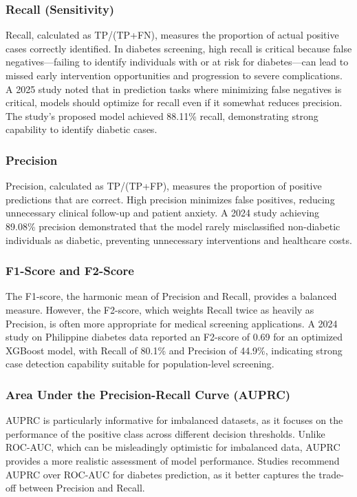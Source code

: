 \subsubsection{Recall (Sensitivity)}

Recall, calculated as TP/(TP+FN), measures the proportion of actual positive cases correctly identified. In diabetes screening, high recall is critical because false negatives—failing to identify individuals with or at risk for diabetes—can lead to missed early intervention opportunities and progression to severe complications. A 2025 study noted that in prediction tasks where minimizing false negatives is critical, models should optimize for recall even if it somewhat reduces precision. The study's proposed model achieved 88.11\% recall, demonstrating strong capability to identify diabetic cases.

\subsubsection{Precision}

Precision, calculated as TP/(TP+FP), measures the proportion of positive predictions that are correct. High precision minimizes false positives, reducing unnecessary clinical follow-up and patient anxiety. A 2024 study achieving 89.08\% precision demonstrated that the model rarely misclassified non-diabetic individuals as diabetic, preventing unnecessary interventions and healthcare costs.

\subsubsection{F1-Score and F2-Score}

The F1-score, the harmonic mean of Precision and Recall, provides a balanced measure. However, the F2-score, which weights Recall twice as heavily as Precision, is often more appropriate for medical screening applications. A 2024 study on Philippine diabetes data reported an F2-score of 0.69 for an optimized XGBoost model, with Recall of 80.1\% and Precision of 44.9\%, indicating strong case detection capability suitable for population-level screening.

\subsubsection{Area Under the Precision-Recall Curve (AUPRC)}

AUPRC is particularly informative for imbalanced datasets, as it focuses on the performance of the positive class across different decision thresholds. Unlike ROC-AUC, which can be misleadingly optimistic for imbalanced data, AUPRC provides a more realistic assessment of model performance. Studies recommend AUPRC over ROC-AUC for diabetes prediction, as it better captures the trade-off between Precision and Recall.


